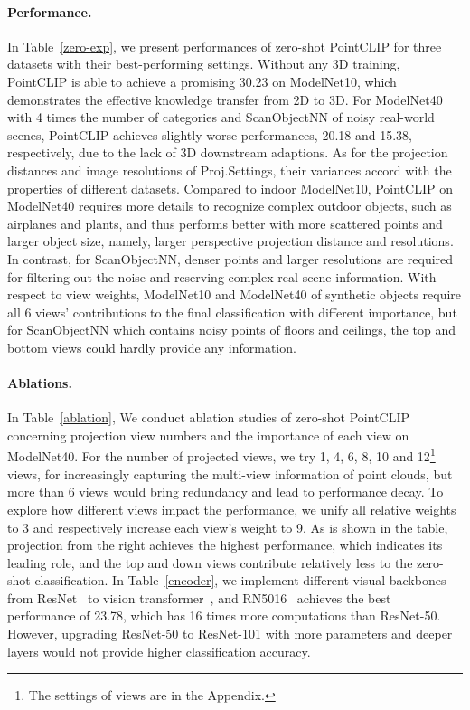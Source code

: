 \documentclass[10pt,twocolumn,letterpaper]{article}
\begin{document}
\vspace*{-5pt}
\paragraph{Performance.} In Table~\ref{zero-exp}, we present performances of zero-shot PointCLIP for three datasets with their best-performing settings. Without any 3D training, PointCLIP is able to achieve a promising 30.23 on ModelNet10, which demonstrates the effective knowledge transfer from 2D to 3D. For ModelNet40 with 4 times the number of categories and ScanObjectNN of noisy real-world scenes, PointCLIP achieves slightly worse performances, 20.18 and 15.38, respectively, due to the lack of 3D downstream adaptions. As for the projection distances and image resolutions of Proj.Settings, their variances accord with the properties of different datasets. Compared to indoor ModelNet10, PointCLIP on ModelNet40 requires more details to recognize complex outdoor objects, such as airplanes and plants, and thus performs better with more scattered points and larger object size, namely, larger perspective projection distance and resolutions. In contrast, for ScanObjectNN, denser points and larger resolutions are required for filtering out the noise and reserving complex real-scene information. With respect to view weights, ModelNet10 and ModelNet40 of synthetic objects require all 6 views' contributions to the final classification with different importance, but for ScanObjectNN which contains noisy points of floors and ceilings, the top and bottom views could hardly provide any information.

\vspace*{-8pt}
\paragraph{Ablations.}
\label{abzero}
In Table~\ref{ablation}, We conduct ablation studies of zero-shot PointCLIP concerning projection view numbers and the importance of each view on ModelNet40. For the number of projected views, we try 1, 4, 6, 8, 10 and 12\footnote{The settings of views are in the Appendix.} views, for increasingly capturing the multi-view information of point clouds, but more than 6 views would bring redundancy and lead to performance decay. To explore how different views impact the performance, we unify all relative weights to 3 and respectively increase each view's weight to 9. As is shown in the table, projection from the right achieves the highest performance, which indicates its leading role, and the top and down views contribute relatively less to the zero-shot classification. In Table~\ref{encoder}, we implement different visual backbones from ResNet~\cite{he2016deep} to vision transformer~\cite{dosovitskiy2020image}, and RN5016~\cite{radford2021learning} achieves the best performance of 23.78, which has 16 times more computations than ResNet-50. However, upgrading ResNet-50 to ResNet-101 with more parameters and deeper layers would not provide higher classification accuracy.
\end{document}
